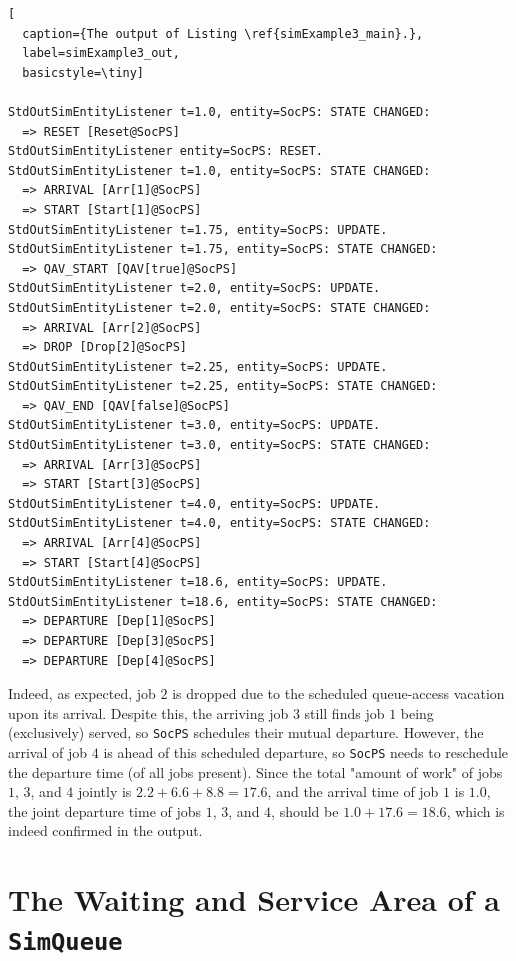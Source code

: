 \documentclass[12pt]{book}
\begin{document}
\begin{lstfloat}
\begin{lstlisting}[
  caption={The output of Listing \ref{simExample3_main}.},
  label=simExample3_out,
  basicstyle=\tiny]

StdOutSimEntityListener t=1.0, entity=SocPS: STATE CHANGED:
  => RESET [Reset@SocPS]
StdOutSimEntityListener entity=SocPS: RESET.
StdOutSimEntityListener t=1.0, entity=SocPS: STATE CHANGED:
  => ARRIVAL [Arr[1]@SocPS]
  => START [Start[1]@SocPS]
StdOutSimEntityListener t=1.75, entity=SocPS: UPDATE.
StdOutSimEntityListener t=1.75, entity=SocPS: STATE CHANGED:
  => QAV_START [QAV[true]@SocPS]
StdOutSimEntityListener t=2.0, entity=SocPS: UPDATE.
StdOutSimEntityListener t=2.0, entity=SocPS: STATE CHANGED:
  => ARRIVAL [Arr[2]@SocPS]
  => DROP [Drop[2]@SocPS]
StdOutSimEntityListener t=2.25, entity=SocPS: UPDATE.
StdOutSimEntityListener t=2.25, entity=SocPS: STATE CHANGED:
  => QAV_END [QAV[false]@SocPS]
StdOutSimEntityListener t=3.0, entity=SocPS: UPDATE.
StdOutSimEntityListener t=3.0, entity=SocPS: STATE CHANGED:
  => ARRIVAL [Arr[3]@SocPS]
  => START [Start[3]@SocPS]
StdOutSimEntityListener t=4.0, entity=SocPS: UPDATE.
StdOutSimEntityListener t=4.0, entity=SocPS: STATE CHANGED:
  => ARRIVAL [Arr[4]@SocPS]
  => START [Start[4]@SocPS]
StdOutSimEntityListener t=18.6, entity=SocPS: UPDATE.
StdOutSimEntityListener t=18.6, entity=SocPS: STATE CHANGED:
  => DEPARTURE [Dep[1]@SocPS]
  => DEPARTURE [Dep[3]@SocPS]
  => DEPARTURE [Dep[4]@SocPS]

\end{lstlisting}
\end{lstfloat}

Indeed, as expected, job $2$ is dropped due to the scheduled queue-access vacation
  upon its arrival.
Despite this,
  the arriving job $3$ still finds job $1$ being (exclusively) served,
  so \lstinline|SocPS| schedules their mutual departure.
However,
  the arrival of job $4$ is ahead of this scheduled departure,
  so \lstinline|SocPS| needs to reschedule the departure time
  (of all jobs present).
Since the total "amount of work"
  of jobs $1$, $3$, and $4$ jointly is $2.2 + 6.6 + 8.8 = 17.6$,
  and the arrival time of job $1$ is $1.0$,
  the joint departure time of jobs $1$, $3$, and $4$,
  should be $1.0+17.6=18.6$,
  which is indeed confirmed in the output.

\section{The Waiting and Service Area of a \texttt{SimQueue}}
\label{sec:guided:wait-serv-area}
\end{document}
